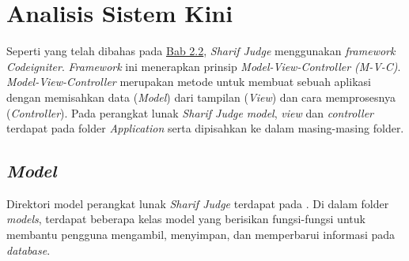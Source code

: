 \section{Analisis Sistem Kini}

Seperti yang telah dibahas pada \hyperref[sec:sharifjudge]{Bab 2.2}, \textit{\textit{Sharif Judge}} menggunakan\textit{ framework Codeigniter}. \textit{Framework} ini menerapkan prinsip \textit{Model-View-Controller (M-V-C)}. \textit{Model-View-Controller} merupakan metode untuk membuat sebuah aplikasi dengan memisahkan data (\textit{Model}) dari tampilan (\textit{View}) dan cara memprosesnya (\textit{Controller}). Pada perangkat lunak \textit{Sharif Judge} \textit{model}, \textit{view} dan \textit{controller} terdapat pada folder \textit{Application} serta dipisahkan ke dalam masing-masing folder.  

\subsection{\textit{Model}}
Direktori model perangkat lunak \textit{Sharif Judge} terdapat pada . Di dalam folder \textit{models}, terdapat beberapa kelas model yang berisikan fungsi-fungsi untuk membantu pengguna mengambil, menyimpan, dan memperbarui informasi pada \textit{database}.


